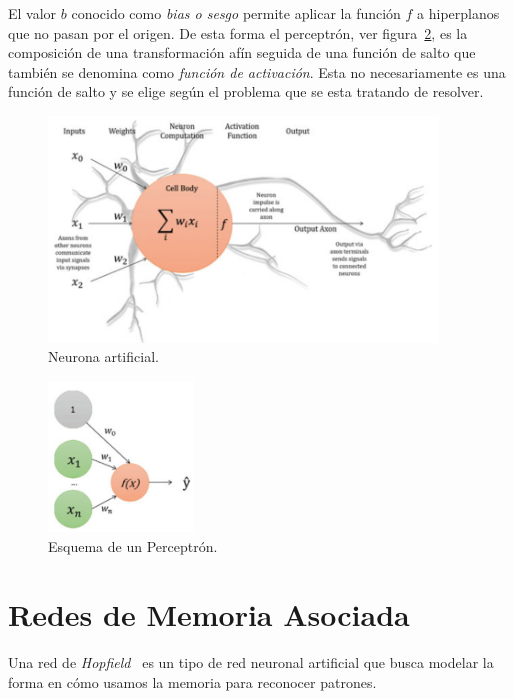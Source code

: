 \documentclass[letterpaper,12pt]{article}
\begin{document}
El valor $b$ conocido como \emph{bias o sesgo} permite aplicar la función $f$ a hiperplanos que no pasan por el origen. De esta forma el perceptrón, ver figura~\ref{perceptron}, es la composición de una transformación afín seguida de una función de salto que también se denomina como \emph{función de activación}. Esta no necesariamente es una función de salto y se elige según el problema que se esta tratando de resolver. \\

\begin{figure}
\begin{center}
\includegraphics[height=60mm]{neuron.PNG}
\caption{\small{Neurona artificial. }}
\label{neuron}
\end{center}
\end{figure}
\begin{figure}
\begin{center}
\includegraphics[height=40mm]{perceptron.PNG}
\caption{\small{Esquema de un Perceptrón. }}
\label{perceptron}
\end{center}
\end{figure}

\section{Redes de Memoria Asociada}
\label{sec:hop}

Una red de \emph{Hopfield}~\cite{a} es un tipo de red neuronal artificial que busca modelar la forma en cómo usamos la memoria para reconocer patrones. \\
\end{document}
